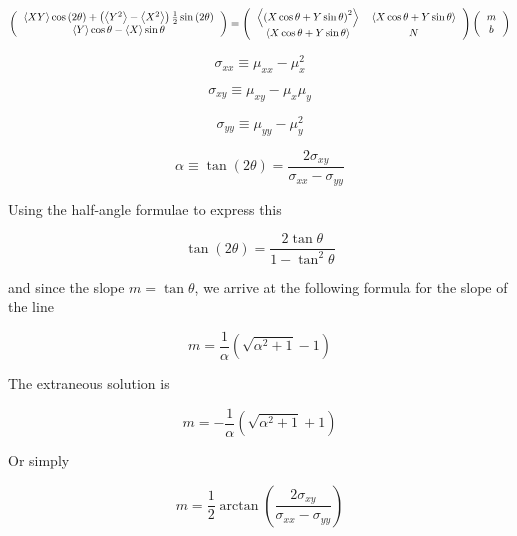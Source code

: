 \documentclass{article}
\newcommand{\meanx}{\ensuremath{\mu_{x}}}
\newcommand{\meanxsquared}{\ensuremath{\mu_{x}^{2}}}
\newcommand{\meany}{\ensuremath{\mu_{y}}}
\newcommand{\meanysquared}{\ensuremath{\mu_{y}^{2}}}
\newcommand{\meanxx}{\ensuremath{\mu_{xx}}}
\newcommand{\meanxy}{\ensuremath{\mu_{xy}}}
\newcommand{\meanyy}{\ensuremath{\mu_{yy}}}
\newcommand{\sxx}{\ensuremath{\sigma_{xx}}}
\newcommand{\sxy}{\ensuremath{\sigma_{xy}}}
\newcommand{\syy}{\ensuremath{\sigma_{yy}}}
\begin{document}
\begin{equation}
\left(
\begin{tabular}{c}
$ \left\langle XY \right\rangle \cos \left( 2 \theta \right) + 
\left( \left\langle Y^{2} \right\rangle - \left\langle X^{2} \right\rangle \right) \frac{1}{2} \sin \left( 2 \theta \right) $ \\
$ \left\langle Y \right\rangle \cos \theta - \left\langle X \right\rangle \sin \theta $
\end{tabular}
\right) = 
\left(
\begin{tabular}{cc}
$ \left\langle \left( X \cos \theta + Y \sin \theta \right)^{2} \right\rangle $ & $ \left\langle X \cos \theta + Y \sin \theta \right\rangle $ \\
$ \left\langle X \cos \theta + Y \sin \theta \right\rangle $ & $N$ \\
\end{tabular}
\right)
\left(
\begin{tabular}{c}
$m$ \\
$b$
\end{tabular}
\right)
\end{equation}






\begin{equation}
\sxx \equiv \meanxx - {\meanxsquared}
\end{equation}

\begin{equation}
\sxy \equiv \meanxy - \meanx \meany
\end{equation}

\begin{equation}
\syy \equiv \meanyy - \meanysquared
\end{equation}

\begin{equation}
\alpha \equiv \tan \left( 2 \theta \right) = \frac{2 \sxy}{\sxx - \syy}
\end{equation}

Using the half-angle formulae to express this

\begin{equation}
\tan \left( 2 \theta \right) = \frac{2 \tan \theta}{1 - \tan^{2} \theta}
\end{equation}

and since the slope $m = \tan \theta $, we arrive at the following formula for the slope of the line

\begin{equation}
m = \frac{1}{\alpha} \left( \sqrt{\alpha^{2} + 1} - 1\right)
\end{equation}

The extraneous solution is

\begin{equation}
m = - \frac{1}{\alpha} \left( \sqrt{\alpha^{2} + 1} + 1\right)
\end{equation}

Or simply

\begin{equation}
m = \frac{1}{2} \arctan \left( \frac{2 \sxy}{\sxx - \syy} \right)
\end{equation}
\end{document}
